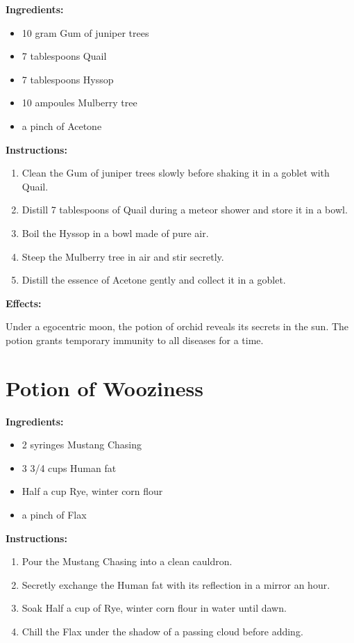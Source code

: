 \documentclass{article}
\begin{document}
\textbf{Ingredients:}

\begin{itemize}
  \item 10 gram Gum of juniper trees
  \item 7 tablespoons Quail
  \item 7 tablespoons Hyssop
  \item 10 ampoules Mulberry tree
  \item a pinch of Acetone
\end{itemize}

\textbf{Instructions:}

\begin{enumerate}
  \item Clean the Gum of juniper trees slowly before shaking it in a goblet with Quail.
  \item Distill 7 tablespoons of Quail during a meteor shower and store it in a bowl.
  \item Boil the Hyssop in a bowl made of pure air.
  \item Steep the Mulberry tree in air and stir secretly.
  \item Distill the essence of Acetone gently and collect it in a goblet.
\end{enumerate}

\textbf{Effects:}

Under a egocentric moon, the potion of orchid reveals its secrets in the sun. The potion grants temporary immunity to all diseases for a time.

\newpage
\section*{Potion of Wooziness}

\textbf{Ingredients:}

\begin{itemize}
  \item 2 syringes Mustang Chasing
  \item 3 3/4 cups Human fat
  \item Half a cup Rye, winter corn flour
  \item a pinch of Flax
\end{itemize}

\textbf{Instructions:}

\begin{enumerate}
  \item Pour the Mustang Chasing into a clean cauldron.
  \item Secretly exchange the Human fat with its reflection in a mirror an hour.
  \item Soak Half a cup of Rye, winter corn flour in water until dawn.
  \item Chill the Flax under the shadow of a passing cloud before adding.
\end{enumerate}
\end{document}
